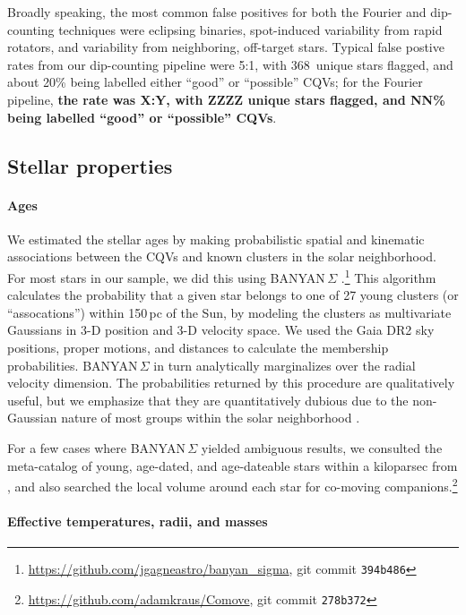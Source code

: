 \documentclass[11pt,twocolumn,tighten]{aastex63}
\newcommand{\nuniqdipflagged}{{368}} %
\begin{document}
Broadly speaking, the most common false positives for both the Fourier
and dip-counting techniques were eclipsing binaries, spot-induced
variability from rapid rotators, and variability from neighboring,
off-target stars.  Typical false postive rates from our dip-counting
pipeline were 5:1, with \nuniqdipflagged\ unique stars flagged, and
about 20\% being labelled either ``good'' or ``possible'' CQVs; for
the Fourier pipeline, {\bf the rate was X:Y, with ZZZZ unique stars
flagged, and NN\% being labelled ``good'' or ``possible'' CQVs}.


\subsection{Stellar properties}
\label{subsec:starprops}

\paragraph{Ages}
We estimated the stellar ages by making probabilistic spatial and
kinematic associations between the CQVs and known clusters in the
solar neighborhood.  For most stars in our sample, we did
this using BANYAN\,$\Sigma$
\citep{2018ApJ...856...23G}.\footnote{\url{https://github.com/jgagneastro/banyan_sigma},
git commit \texttt{394b486}} This algorithm calculates the probability
that a given star belongs to one of 27 young clusters (or
``assocations'') within 150\,pc of the Sun, by modeling the clusters
as multivariate Gaussians in 3-D position and 3-D velocity space.  We
used the Gaia DR2 sky positions, proper motions, and distances to
calculate the membership probabilities.  BANYAN\,$\Sigma$ in turn
analytically marginalizes over the radial velocity dimension.  The
probabilities returned by this procedure are qualitatively useful, but
we emphasize that they are quantitatively dubious due to the
non-Gaussian nature of most groups within the solar neighborhood
\citep[see e.g.][Figure~10]{2021ApJ...917...23K}.


For a few cases where BANYAN\,$\Sigma$ yielded ambiguous results, we
consulted the meta-catalog of young, age-dated, and age-dateable stars
within a kiloparsec from \citet{2022AJ....163..121B}, and also
searched the local volume around each star for co-moving
companions.\footnote{\url{https://github.com/adamkraus/Comove}, git
commit \texttt{278b372}}


\paragraph{Effective temperatures, radii, and masses}
\end{document}

